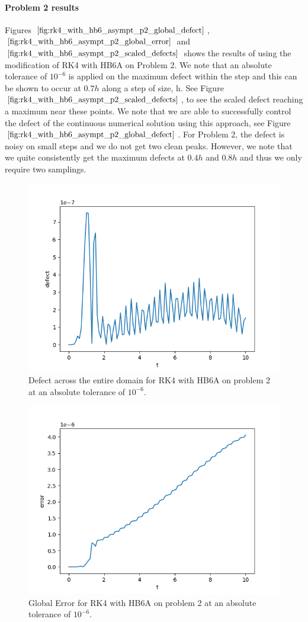 \paragraph{Problem 2 results}
Figures $\ref{fig:rk4_with_hb6_asympt_p2_global_defect}$, $\ref{fig:rk4_with_hb6_asympt_p2_global_error}$ and $\ref{fig:rk4_with_hb6_asympt_p2_scaled_defects}$ shows the results of using the modification of RK4 with HB6A on Problem 2. We note that an absolute tolerance of $10^{-6}$ is applied on the maximum defect within the step and this can be shown to occur at $0.7h$ along a step of size, h. See Figure $\ref{fig:rk4_with_hb6_asympt_p2_scaled_defects}$, to see the scaled defect reaching a maximum near these points. We note that we are able to successfully control the defect of the continuous numerical solution using this approach, see Figure $\ref{fig:rk4_with_hb6_asympt_p2_global_defect}$. For Problem 2, the defect is noisy on small steps and we do not get two clean peaks. However, we note that we quite consistently get the maximum defects at $0.4h$ and $0.8h$ and thus we only require two samplings.

\begin{figure}[H]
\centering
\includegraphics[width=0.7\linewidth]{./figures/rk4_with_hb6_asympt_p2_global_defect}
\caption{Defect across the entire domain for RK4 with HB6A on problem 2 at an absolute tolerance of $10^{-6}$.}
\label{fig:rk4_with_hb6_asympt_p2_global_defect}
\end{figure}

\begin{figure}[H]
\centering
\includegraphics[width=0.7\linewidth]{./figures/rk4_with_hb6_asympt_p2_global_error}
\caption{Global Error for RK4 with HB6A on problem 2 at an absolute tolerance of $10^{-6}$.}
\label{fig:rk4_with_hb6_asympt_p2_global_error}
\end{figure}

